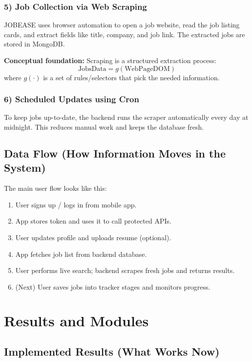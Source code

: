 \documentclass[12pt,a4paper]{report}
\begin{document}
\subsection*{5) Job Collection via Web Scraping}
\noindent
JOBEASE uses browser automation to open a job website, read the job listing cards, and extract fields like title, company, and job link. The extracted jobs are stored in MongoDB.

\medskip
\noindent
\textbf{Conceptual foundation:} Scraping is a structured extraction process:
\[
\text{JobsData} = g(\text{WebPageDOM})
\]
where \(g(\cdot)\) is a set of rules/selectors that pick the needed information.

\subsection*{6) Scheduled Updates using Cron}
\noindent
To keep jobs up-to-date, the backend runs the scraper automatically every day at midnight. This reduces manual work and keeps the database fresh.

\section*{Data Flow (How Information Moves in the System)}
\noindent
The main user flow looks like this:
\begin{enumerate}[leftmargin=*, itemsep=6pt]
  \item User signs up / logs in from mobile app.
  \item App stores token and uses it to call protected APIs.
  \item User updates profile and uploads resume (optional).
  \item App fetches job list from backend database.
  \item User performs live search; backend scrapes fresh jobs and returns results.
  \item (Next) User saves jobs into tracker stages and monitors progress.
\end{enumerate}

\chapter{Results and Modules}
\section*{Implemented Results (What Works Now)}
\end{document}
